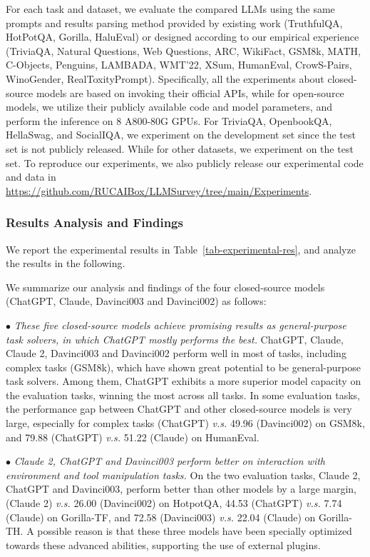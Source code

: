  For each task and dataset, we evaluate the compared LLMs using the same %
prompts and results parsing method provided by existing work  {(\ie TruthfulQA, HotPotQA, Gorilla, HaluEval)} or designed according to our empirical experience  {(\ie TriviaQA, Natural Questions, Web Questions, ARC, WikiFact, GSM8k, MATH, C-Objects, Penguins, LAMBADA, WMT'22, XSum, HumanEval, CrowS-Pairs, WinoGender, RealToxityPrompt).}
Specifically, all the experiments about closed-source models are based on invoking their official APIs, while for open-source models, we utilize their publicly available code and model parameters, and perform the inference on 8 A800-80G GPUs.
For TriviaQA, OpenbookQA, HellaSwag, and SocialIQA, we experiment on the development set since the test set is not publicly released. While for other datasets, we experiment on the test set. %
To reproduce our experiments, we also publicly release our experimental code and data in \url{https://github.com/RUCAIBox/LLMSurvey/tree/main/Experiments}. 


\subsubsection{Results Analysis and Findings}
We report the experimental results in Table~\ref{tab-experimental-res}, and analyze the results in the following.

We summarize our analysis and findings of  {the four} closed-source models (\ie ChatGPT, Claude, Davinci003 and Davinci002) as follows:

$\bullet$ %
{\emph{These five closed-source models achieve promising results as general-purpose task solvers, in which ChatGPT mostly performs the best.} ChatGPT, Claude, Claude 2, Davinci003 and Davinci002 perform well in most of tasks, including complex tasks (\eg GSM8k), which have shown great potential to be general-purpose task solvers. %
Among them,  ChatGPT exhibits a more superior model capacity on the evaluation tasks, winning the most across all tasks.
In some evaluation tasks, the performance gap between ChatGPT and other closed-source models is very large, especially for  complex tasks  (ChatGPT) \emph{v.s.} 49.96 (Davinci002) on GSM8k, and 79.88 (ChatGPT) \emph{v.s.}  51.22 (Claude) on HumanEval.
}


$\bullet$ \emph{{Claude 2, ChatGPT and Davinci003} perform better on interaction with environment and tool manipulation tasks.}
On the two evaluation tasks, Claude 2, ChatGPT and Davinci003, perform better than other models by a large margin,  (Claude 2) \emph{v.s.} 26.00 (Davinci002) on HotpotQA, 44.53 (ChatGPT) \emph{v.s.} 7.74 (Claude) on Gorilla-TF, and 72.58 (Davinci003) \emph{v.s.} 22.04 (Claude) on Gorilla-TH. 
{A possible reason is that these three models have been specially optimized towards these advanced abilities, \eg supporting the use of external plugins.  }

